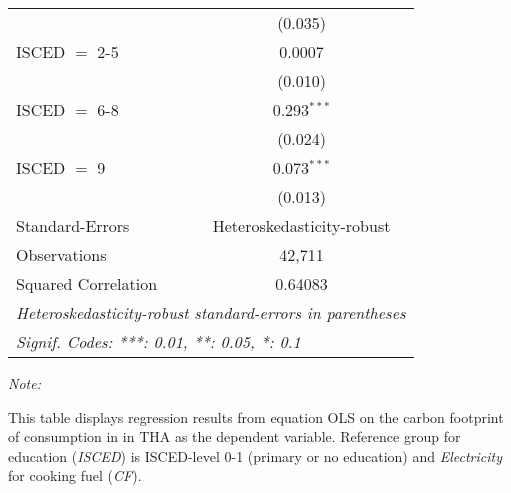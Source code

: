 \begin{table}[htbp!]
\begin{adjustbox}{width = 1\textwidth, max height = 0.95\textheight, center}
\begin{threeparttable}[b]
\begin{tabular}{lc}
                                & (0.035)\\   
            ISCED $=$ 2-5       & 0.0007\\   
                                & (0.010)\\   
            ISCED $=$ 6-8       & 0.293$^{***}$\\   
                                & (0.024)\\   
            ISCED $=$ 9         & 0.073$^{***}$\\   
                                & (0.013)\\   
            \midrule 
            Standard-Errors     & Heteroskedasticity-robust \\   
            Observations        & 42,711\\  
            Squared Correlation & 0.64083\\  
            \midrule \midrule
            \multicolumn{2}{l}{\emph{Heteroskedasticity-robust standard-errors in parentheses}}\\
            \multicolumn{2}{l}{\emph{Signif. Codes: ***: 0.01, **: 0.05, *: 0.1}}\\
         \end{tabular}
         
         \begin{tablenotes}\item \medskip \textit{Note:}
            \item This table displays regression results from equation OLS on the carbon footprint of consumption in  in THA as the dependent variable.  Reference group for education (\textit{ISCED}) is ISCED-level 0-1 (primary or no education) and \textit{Electricity} for cooking fuel (\textit{CF}).
         \end{tablenotes}
      \end{threeparttable}
   \end{adjustbox}
\end{table}



